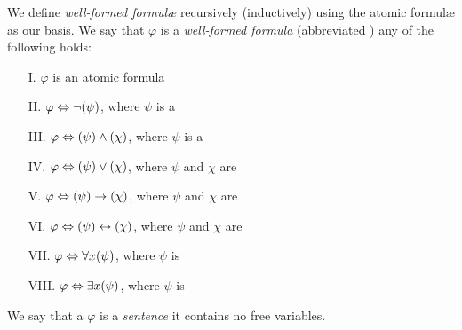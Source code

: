 \begin{definition}
    We define \emph{well-formed formul{\ae}} recursively (\ie inductively) using the atomic formul{\ae} as our basis.
    We say that \(\varphi\) is a \emph{well-formed formula} (abbreviated {\wff}) \iffbydefn
    any of the following holds:
    \begin{enumerate}
        \item[I.]
            \(\varphi\) is an atomic formula
        \item[II.]
            \(\varphi \iff \neg \pn*{\psi}\), where \(\psi\) is a {\wff}
        \item[III.]
            \(\varphi \iff \pn*{\psi} \meet \pn*{\chi}\), where \(\psi\) is a {\wff}
        \item[IV.]
            \(\varphi \iff \pn*{\psi} \join \pn*{\chi}\), where \(\psi\) and \(\chi\) are {\wff}
        \item[V.]
            \(\varphi \iff \pn*{\psi} \rightarrow \pn*{\chi}\), where \(\psi\) and \(\chi\) are {\wff}
        \item[VI.]
            \(\varphi \iff \pn*{\psi} \leftrightarrow \pn*{\chi}\), where \(\psi\) and \(\chi\) are {\wff}
        \item[VII.]
            \(\varphi \iff \forall x \pn*{\psi}\), where \(\psi\) is {\wff}
        \item[VIII.]
            \(\varphi \iff \exists x \pn*{\psi}\), where \(\psi\) is {\wff}
    \end{enumerate}
\end{definition}

\begin{definition}[Sentence]
    We say that a {\wff} \(\varphi\) is a \emph{sentence} \iffbydefn it contains no free variables.
\end{definition}


